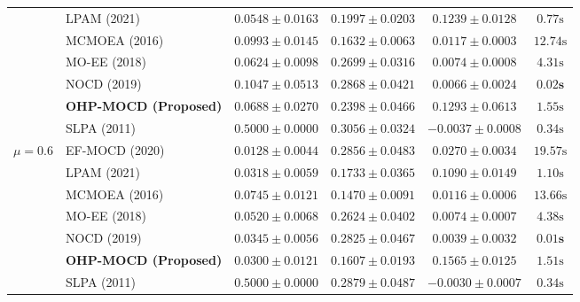 \documentclass{svproc}
\begin{document}
\begin{table}[t]
{\begin{tabular}{@{}clcccc@{}}
 & LPAM (2021) & $0.0548 \pm 0.0163$ & $0.1997 \pm 0.0203$ & $0.1239 \pm 0.0128$ & $0.77\text{s}$ \\
 & MCMOEA (2016) & $0.0993 \pm 0.0145$ & $0.1632 \pm 0.0063$ & $0.0117 \pm 0.0003$ & $12.74\text{s}$ \\
 & MO-EE (2018) & $0.0624 \pm 0.0098$ & $0.2699 \pm 0.0316$ & $0.0074 \pm 0.0008$ & $4.31\text{s}$ \\
 & NOCD (2019) & $0.1047 \pm 0.0513$ & $0.2868 \pm 0.0421$ & $0.0066 \pm 0.0024$ & $\mathbf{0.02\text{s}}$ \\
 & \textbf{OHP-MOCD (Proposed)} & $0.0688 \pm 0.0270$ & $0.2398 \pm 0.0466$ & $\mathbf{0.1293 \pm 0.0613}$ & $1.55\text{s}$ \\
 & SLPA (2011) & $\mathbf{0.5000 \pm 0.0000}$ & $\mathbf{0.3056 \pm 0.0324}$ & $-0.0037 \pm 0.0008$ & $0.34\text{s}$ \\
\midrule
$\mu = 0.6$ & EF-MOCD (2020) & $0.0128 \pm 0.0044$ & $0.2856 \pm 0.0483$ & $0.0270 \pm 0.0034$ & $19.57\text{s}$ \\
 & LPAM (2021) & $0.0318 \pm 0.0059$ & $0.1733 \pm 0.0365$ & $0.1090 \pm 0.0149$ & $1.10\text{s}$ \\
 & MCMOEA (2016) & $0.0745 \pm 0.0121$ & $0.1470 \pm 0.0091$ & $0.0116 \pm 0.0006$ & $13.66\text{s}$ \\
 & MO-EE (2018) & $0.0520 \pm 0.0068$ & $0.2624 \pm 0.0402$ & $0.0074 \pm 0.0007$ & $4.38\text{s}$ \\
 & NOCD (2019) & $0.0345 \pm 0.0056$ & $0.2825 \pm 0.0467$ & $0.0039 \pm 0.0032$ & $\mathbf{0.01\text{s}}$ \\
 & \textbf{OHP-MOCD (Proposed)} & $0.0300 \pm 0.0121$ & $0.1607 \pm 0.0193$ & $\mathbf{0.1565 \pm 0.0125}$ & $1.51\text{s}$ \\
 & SLPA (2011) & $\mathbf{0.5000 \pm 0.0000}$ & $\mathbf{0.2879 \pm 0.0487}$ & $-0.0030 \pm 0.0007$ & $0.34\text{s}$ \\
\bottomrule
\end{tabular}%
}
\end{table}
\end{document}
